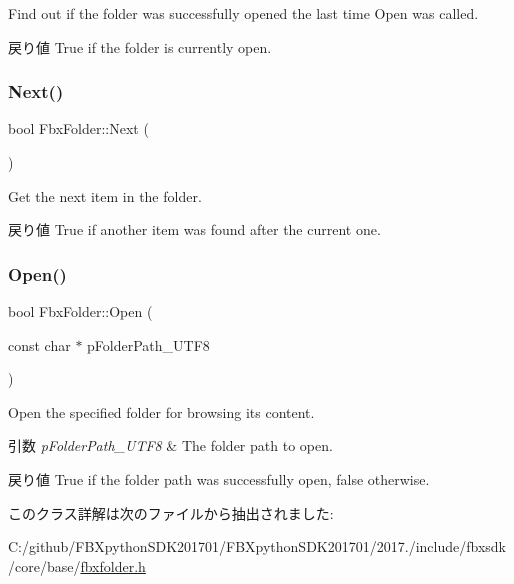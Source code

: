 Find out if the folder was successfully opened the last time Open was called. \begin{DoxyReturn}{戻り値}
True if the folder is currently open. 
\end{DoxyReturn}
\mbox{\label{class_fbx_folder_aae7143fd3d6c61581af8d102564c904a}} 
\subsubsection{\texorpdfstring{Next()}{Next()}}
{\footnotesize\ttfamily bool Fbx\+Folder\+::\+Next (\begin{DoxyParamCaption}{ }\end{DoxyParamCaption})}

Get the next item in the folder. \begin{DoxyReturn}{戻り値}
True if another item was found after the current one. 
\end{DoxyReturn}
\mbox{\label{class_fbx_folder_a84cebc4677af006fa464547079e943c2}} 
\subsubsection{\texorpdfstring{Open()}{Open()}}
{\footnotesize\ttfamily bool Fbx\+Folder\+::\+Open (\begin{DoxyParamCaption}\item[{const char $\ast$}]{p\+Folder\+Path\+\_\+\+U\+T\+F8 }\end{DoxyParamCaption})}

Open the specified folder for browsing its content. 
\begin{DoxyParams}{引数}
{\em p\+Folder\+Path\+\_\+\+U\+T\+F8} & The folder path to open. \\
\hline
\end{DoxyParams}
\begin{DoxyReturn}{戻り値}
True if the folder path was successfully open, false otherwise. 
\end{DoxyReturn}


このクラス詳解は次のファイルから抽出されました\+:\begin{DoxyCompactItemize}
\item 
C\+:/github/\+F\+B\+Xpython\+S\+D\+K201701/\+F\+B\+Xpython\+S\+D\+K201701/2017./include/fbxsdk/core/base/\hyperlink{fbxfolder_8h}{fbxfolder.\+h}\end{DoxyCompactItemize}

